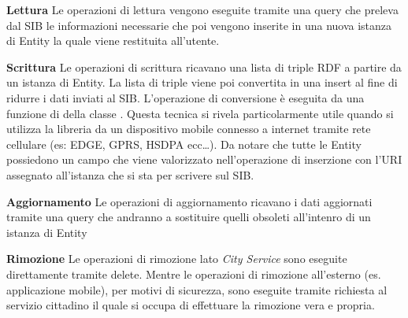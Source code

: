 \begin{description}
	\item \textbf{Lettura} Le operazioni di lettura vengono eseguite tramite una query  che preleva dal SIB le informazioni necessarie che poi vengono inserite in una nuova istanza di Entity la quale viene restituita all'utente.

	\item \textbf{Scrittura} Le operazioni di scrittura ricavano una lista di triple RDF a partire da un istanza di Entity. La lista di triple viene poi convertita in una  insert al fine di ridurre i dati inviati al SIB. L'operazione di conversione è eseguita da una funzione di della  classe . Questa tecnica si rivela particolarmente utile quando si utilizza la libreria da un dispositivo mobile connesso a internet tramite rete cellulare (es: EDGE, GPRS, HSDPA ecc\dots). Da notare che tutte le Entity possiedono un campo  che viene valorizzato nell'operazione di inserzione con l'URI assegnato all'istanza che si sta per scrivere sul SIB. 

	\item \textbf{Aggiornamento} Le operazioni di aggiornamento ricavano i dati aggiornati tramite una query  che andranno a sostituire quelli obsoleti all'intenro di un istanza di Entity

	\item \textbf{Rimozione} Le operazioni di rimozione lato \emph{City Service} sono eseguite direttamente tramite  delete. Mentre le operazioni di rimozione all'esterno (es. applicazione mobile), per motivi di sicurezza, sono eseguite tramite richiesta al servizio cittadino il quale si occupa di effettuare la rimozione vera e propria.
\end{description}













